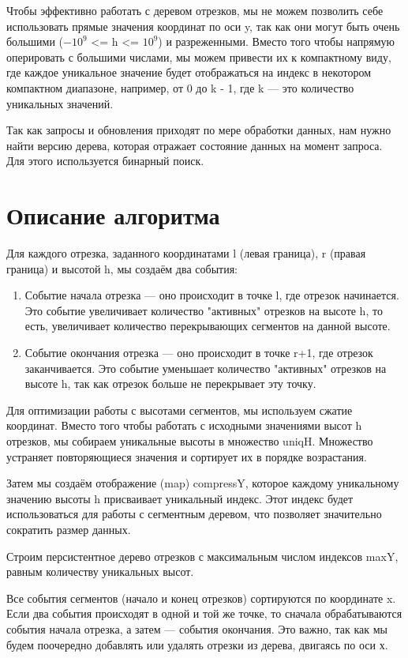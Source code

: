 \documentclass[12pt]{article}
\begin{document}
Чтобы эффективно работать с деревом отрезков, мы не можем позволить себе использовать прямые значения координат по оси y, так как они могут быть очень большими ($-10^{9}$ <= h <= $10^{9}$) и разреженными. Вместо того чтобы напрямую оперировать с большими числами, мы можем привести их к компактному виду, где каждое уникальное значение будет отображаться на индекс в некотором компактном диапазоне, например, от 0 до k - 1, где k — это количество уникальных значений.

Так как запросы и обновления приходят по мере обработки данных, нам нужно найти версию дерева, которая отражает состояние данных на момент запроса. Для этого используется бинарный поиск.

\newpage
\section*{Описание алгоритма}

Для каждого отрезка, заданного координатами l (левая граница), r (правая граница) и высотой h, мы создаём два события:

\begin{enumerate}
    \item Событие начала отрезка — оно происходит в точке l, где отрезок начинается. Это событие увеличивает количество "активных" отрезков на высоте h, то есть, увеличивает количество перекрывающих сегментов на данной высоте.
    \item Событие окончания отрезка — оно происходит в точке r+1, где отрезок заканчивается. Это событие уменьшает  количество "активных" отрезков на высоте h, так как отрезок больше не перекрывает эту точку.
\end{enumerate}

Для оптимизации работы с высотами сегментов, мы используем сжатие координат. Вместо того чтобы работать с исходными значениями высот h отрезков, мы собираем уникальные высоты в множество uniqH. Множество устраняет повторяющиеся значения и сортирует их в порядке возрастания.

Затем мы создаём отображение (map) compressY, которое каждому уникальному значению высоты h присваивает уникальный индекс. Этот индекс будет использоваться для работы с сегментным деревом, что позволяет значительно сократить размер данных. 

Строим персистентное дерево отрезков с максимальным числом индексов maxY, равным количеству уникальных высот.

Все события сегментов (начало и конец отрезков) сортируются по координате x. Если два события происходят в одной и той же точке, то сначала обрабатываются события начала отрезка, а затем — события окончания. Это важно, так как мы будем поочередно добавлять или удалять отрезки из дерева, двигаясь по оси х.
\end{document}
